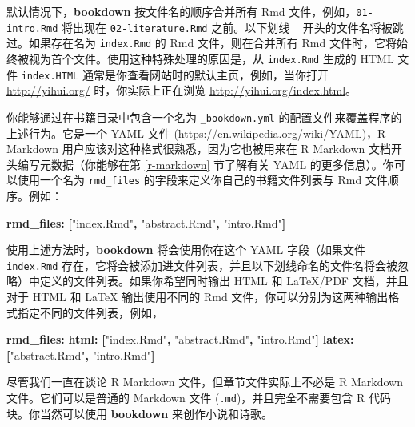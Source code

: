 \documentclass[
  12pt,
]{krantz}
\newenvironment{Shaded}{\begin{snugshade}}{\end{snugshade}}
\newcommand{\AttributeTok}[1]{\textcolor[rgb]{0.13,0.29,0.53}{#1}}
\newcommand{\FunctionTok}[1]{\textcolor[rgb]{0.13,0.29,0.53}{\textbf{#1}}}
\newcommand{\KeywordTok}[1]{\textcolor[rgb]{0.13,0.29,0.53}{\textbf{#1}}}
\newcommand{\StringTok}[1]{\textcolor[rgb]{0.31,0.60,0.02}{#1}}
\theoremstyle{definition}
\theoremstyle{definition}
\theoremstyle{definition}
\theoremstyle{definition}
\theoremstyle{remark}
\begin{document}
默认情况下，\textbf{bookdown} 按文件名的顺序合并所有 Rmd 文件，例如，\texttt{01-intro.Rmd} 将出现在 \texttt{02-literature.Rmd} 之前。以下划线 \texttt{\_} 开头的文件名将被跳过。如果存在名为 \texttt{index.Rmd} 的 Rmd 文件，则在合并所有 Rmd 文件时，它将始终被视为首个文件。使用这种特殊处理的原因是，从 \texttt{index.Rmd} 生成的 HTML 文件 \texttt{index.HTML} 通常是你查看网站时的默认主页，例如，当你打开 \url{http://yihui.org/} 时，你实际上正在浏览 \url{http://yihui.org/index.html}。

你能够通过在书籍目录中包含一个名为 \texttt{\_bookdown.yml} 的配置文件来覆盖程序的上述行为。它是一个 YAML 文件 (\url{https://en.wikipedia.org/wiki/YAML})，R Markdown 用户应该对这种格式很熟悉，因为它也被用来在 R Markdown 文档开头编写元数据（你能够在第 \ref{r-markdown} 节了解有关 YAML 的更多信息）。你可以使用一个名为 \texttt{rmd\_files} 的字段来定义你自己的书籍文件列表与 Rmd 文件顺序。例如：

\begin{Shaded}
\begin{Highlighting}[]
\FunctionTok{rmd\_files}\KeywordTok{:}\AttributeTok{ }\KeywordTok{[}\StringTok{"index.Rmd"}\KeywordTok{,}\AttributeTok{ }\StringTok{"abstract.Rmd"}\KeywordTok{,}\AttributeTok{ }\StringTok{"intro.Rmd"}\KeywordTok{]}
\end{Highlighting}
\end{Shaded}

使用上述方法时，\textbf{bookdown} 将会使用你在这个 YAML 字段（如果文件 \texttt{index.Rmd} 存在，它将会被添加进文件列表，并且以下划线命名的文件名将会被忽略）中定义的文件列表。如果你希望同时输出 HTML 和 LaTeX/PDF 文档，并且对于 HTML 和 LaTeX 输出使用不同的 Rmd 文件，你可以分别为这两种输出格式指定不同的文件列表，例如，

\begin{Shaded}
\begin{Highlighting}[]
\FunctionTok{rmd\_files}\KeywordTok{:}
\AttributeTok{  }\FunctionTok{html}\KeywordTok{:}\AttributeTok{ }\KeywordTok{[}\StringTok{"index.Rmd"}\KeywordTok{,}\AttributeTok{ }\StringTok{"abstract.Rmd"}\KeywordTok{,}\AttributeTok{ }\StringTok{"intro.Rmd"}\KeywordTok{]}
\AttributeTok{  }\FunctionTok{latex}\KeywordTok{:}\AttributeTok{ }\KeywordTok{[}\StringTok{"abstract.Rmd"}\KeywordTok{,}\AttributeTok{ }\StringTok{"intro.Rmd"}\KeywordTok{]}
\end{Highlighting}
\end{Shaded}

尽管我们一直在谈论 R Markdown 文件，但章节文件实际上不必是 R Markdown 文件。它们可以是普通的 Markdown 文件 (\texttt{.md})，并且完全不需要包含 R 代码块。你当然可以使用 \textbf{bookdown} 来创作小说和诗歌。
\end{document}
